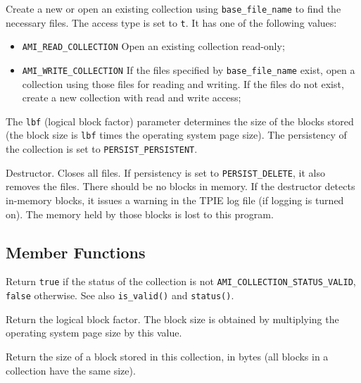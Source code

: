          {Create a new or open an 
        existing collection using \lstinline|base_file_name| to find the
        necessary files. The access type is set to \lstinline|t|. It has one of
        the following values:
        \begin{itemize} 
          \item[]\lstinline|AMI_READ_COLLECTION| Open an existing collection
          read-only;
          \item[]\lstinline|AMI_WRITE_COLLECTION| If the files specified by
          \lstinline|base_file_name| exist, open a collection using those files
          for reading and writing. If the files do not exist, create a new
          collection with read and write access;
        \end{itemize}
        The \lstinline|lbf| (logical block factor) parameter determines the size
        of the blocks stored (the block size is \lstinline|lbf| times the
        operating system page size). The persistency of the collection is
        set to \lstinline|PERSIST_PERSISTENT|.}

       {Destructor.
      Closes all files. If persistency is set to \lstinline|PERSIST_DELETE|, it
      also removes the files. There should be no blocks in memory. If the
      destructor detects in-memory blocks, it issues a warning in the TPIE
      log file (if logging is turned on). The memory held by those blocks
      is lost to this program.}

   \etabb

\subsection{Member Functions}

   \btabb

         {Return \lstinline|true| if
        the status of the collection is not
        \lstinline|AMI_COLLECTION_STATUS_VALID|, \lstinline|false|
        otherwise. See also \lstinline|is_valid()| and \lstinline|status()|.}

         {Return the logical
        block factor. The block size is obtained by multiplying the
        operating system page size by this value.}

         {Return the size of a block
        stored in this collection, in bytes (all blocks in a collection
        have the same size).}

